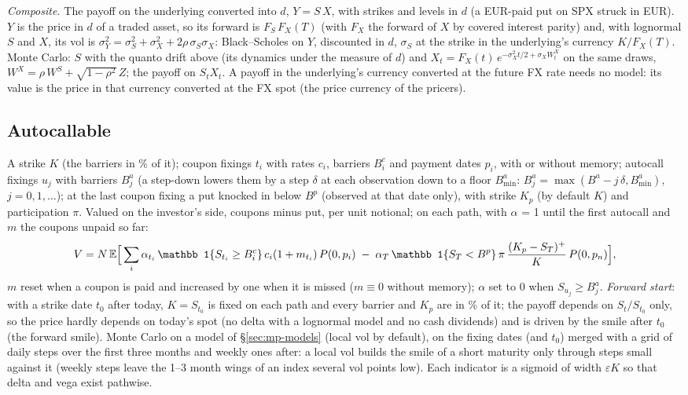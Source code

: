 \emph{Composite.} The payoff on the underlying converted into $d$, $Y = S\,X$, with strikes and levels in $d$ (a
EUR-paid put on SPX struck in EUR). $Y$ is the price in $d$ of a traded asset, so its forward is $F_S\,F_X(T)$ (with
$F_X$ the forward of $X$ by covered interest parity) and, with lognormal $S$ and $X$, its vol is
$\sigma_Y^2 = \sigma_S^2 + \sigma_X^2 + 2\rho\,\sigma_S\sigma_X$: Black--Scholes on $Y$, discounted in $d$, $\sigma_S$ at
the strike in the underlying's currency $K / F_X(T)$. Monte Carlo: $S$ with the quanto drift above (its dynamics
under the measure of $d$) and $X_t = F_X(t)\,e^{-\sigma_X^2 t/2 + \sigma_X W^X_t}$ on the same draws,
$W^X = \rho\,W^S + \sqrt{1-\rho^2}\,Z$; the payoff on $S_t X_t$. A payoff in the underlying's currency converted at
the future FX rate needs no model: its value is the price in that currency converted at the FX spot (the price
currency of the pricers).

\subsection{Autocallable}\label{sec:mp-autocallable}
A strike $K$ (the barriers in \% of it); coupon fixings $t_i$ with rates $c_i$, barriers $B^c_i$ and payment dates $p_i$, with or
without memory; autocall fixings $u_j$ with barriers $B^a_j$ (a step-down lowers them by a step $\delta$ at each
observation down to a floor $B^a_{\min}$: $B^a_j = \max(B^a - j\,\delta, B^a_{\min})$, $j = 0, 1, \dots$); at the last
coupon fixing a put knocked in below $B^p$ (observed
at that date only), with strike $K_p$ (by default $K$) and participation $\pi$. Valued on the investor's side, coupons minus put, per unit notional; on each
path, with $\alpha$ = 1 until the first autocall and $m$ the coupons unpaid so far:
\[
  V = N\,\E\Big[\sum_i \alpha_{t_i}\,\mathbb 1\{S_{t_i} \ge B^c_i\}\,c_i(1 + m_{t_i})\,P(0,p_i)
  \;-\; \alpha_T\,\mathbb 1\{S_T < B^p\}\,\pi\,\frac{(K_p - S_T)^+}{K}\,P(0,p_n)\Big],
\]
$m$ reset when a coupon is paid and increased by one when it is missed ($m \equiv 0$ without memory); $\alpha$ set to 0 when
$S_{u_j} \ge B^a_j$. \emph{Forward start}: with a strike date $t_0$ after today, $K = S_{t_0}$ is fixed on each path and every
barrier and $K_p$ are in \% of it; the payoff depends on $S_t / S_{t_0}$ only, so the price hardly depends on today's spot
(no delta with a lognormal model and no cash dividends) and is driven by the smile after $t_0$ (the forward smile).
Monte Carlo on a model of \S\ref{sec:mp-models} (local vol by default), on the fixing dates (and $t_0$) merged with a
grid of daily steps over the first three months and weekly ones after: a local vol builds the smile of a short
maturity only through steps small against it (weekly steps leave the 1--3 month wings of an index several vol
points low). Each indicator is a sigmoid of width $\varepsilon K$ so that delta and vega exist pathwise.

